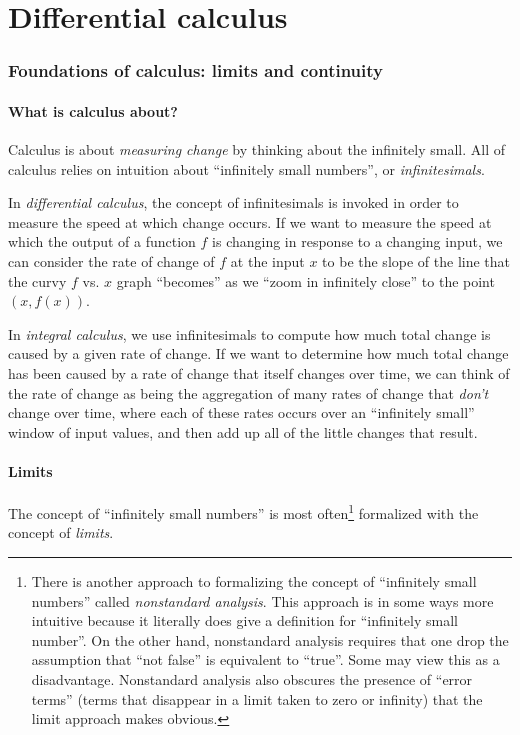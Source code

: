 \part*{Differential calculus}

\section*{Foundations of calculus: limits and continuity}

\subsection*{What is calculus about?}

Calculus is about \textit{measuring change} by thinking about the infinitely small. All of calculus relies on intuition about ``infinitely small numbers'', or \textit{infinitesimals}.

In \textit{differential calculus}, the concept of infinitesimals is invoked in order to measure the speed at which change occurs. If we want to measure the speed at which the output of a function $f$ is changing in response to a changing input, we can consider the rate of change of $f$ at the input $x$ to be the slope of the line that the curvy $f$ vs. $x$ graph ``becomes'' as we ``zoom in infinitely close'' to the point $(x, f(x))$.

In \textit{integral calculus}, we use infinitesimals to compute how much total change is caused by a given rate of change. If we want to determine how much total change has been caused by a rate of change that itself changes over time, we can think of the rate of change as being the aggregation of many rates of change that \textit{don't} change over time, where each of these rates occurs over an ``infinitely small'' window of input values, and then add up all of the little changes that result.

\subsection*{Limits}

The concept of ``infinitely small numbers'' is most often\footnote{There is another approach to formalizing the concept of ``infinitely small numbers'' called \textit{nonstandard analysis}. This approach is in some ways more intuitive because it literally does give a definition for ``infinitely small number''. On the other hand, nonstandard analysis requires that one drop the assumption that ``not false'' is equivalent to ``true''. Some may view this as a disadvantage. Nonstandard analysis also obscures the presence of ``error terms'' (terms that disappear in a limit taken to zero or infinity) that the limit approach makes obvious.} formalized with the concept of \textit{limits}. 


